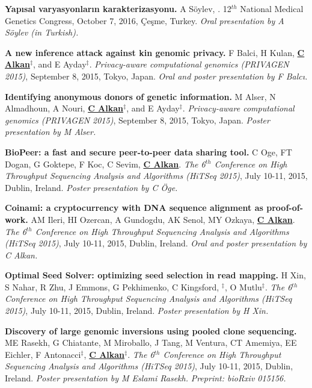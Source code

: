 \vspace{-.2cm}
       {\bf Yapısal varyasyonların karakterizasyonu.} A Söylev, \calkan{}. 12$^{th}$ National Medical Genetics Congress, October 7, 2016, Çeşme, Turkey.
       {\it Oral presentation by A Söylev (in Turkish).}
       
\vspace{-.2cm}
{\bf  A new inference attack against kin genomic privacy.}
F Balci, H Kulan, {\bf {\underline{C Alkan}}}$^\ddag$, and E Ayday$^\ddag$. 
{\em Privacy-aware computational genomics (PRIVAGEN 2015)}, 
 September 8, 2015, Tokyo, Japan. {\it Oral and poster presentation by F Balcı.}

 \vspace{-.2cm}
{\bf Identifying anonymous donors of genetic information.}
M Alser, N Almadhoun, A Nouri, {\bf {\underline{C Alkan}}}$^\ddag$, and E Ayday$^\ddag$. 
{\em Privacy-aware computational genomics (PRIVAGEN 2015)}, 
 September 8, 2015, Tokyo, Japan. {\it Poster presentation by M Alser.}


\vspace{-.2cm}
 {\bf BioPeer: a fast and secure peer-to-peer data sharing tool.}
  C Oge, FT Dogan, G Goktepe, F Koc, C Sevim, {\bf {\underline{C Alkan}}}.
{\em The 6$^{th}$ Conference on High Throughput Sequencing Analysis and Algorithms (HiTSeq 2015)}, 
July 10-11, 2015, Dublin, Ireland. {\it Poster presentation by C Öge.}

\vspace{-.2cm}
 {\bf Coinami: a cryptocurrency with DNA sequence alignment as proof-of-work.}
  AM Ileri, HI Ozercan, A Gundogdu, AK Senol, MY Ozkaya, {\bf {\underline{C Alkan}}}.
{\em The 6$^{th}$ Conference on High Throughput Sequencing Analysis and Algorithms (HiTSeq 2015)}, 
July 10-11, 2015, Dublin, Ireland. {\it Oral and poster presentation by C Alkan.}



\vspace{-.2cm}        
       {\bf Optimal Seed Solver: optimizing seed selection in read mapping.}
       H Xin, S Nahar, R Zhu, J Emmons, G Pekhimenko, C Kingsford, \calkan{}$^\ddag$, O Mutlu$^\ddag$.
{\em The 6$^{th}$ Conference on High Throughput Sequencing Analysis and Algorithms (HiTSeq 2015)}, 
July 10-11, 2015, Dublin, Ireland. {\it Poster presentation by H Xin.}



\vspace{-.2cm}
{\bf Discovery of large genomic inversions using pooled clone sequencing.}
ME Rasekh, G Chiatante, M Miroballo, J Tang, M Ventura, CT Amemiya, EE Eichler, F Antonacci$^\ddag$, {\bf {\underline{C Alkan}}}$^\ddag$.
{\em The 6$^{th}$ Conference on High Throughput Sequencing Analysis and Algorithms (HiTSeq 2015)}, 
July 10-11, 2015, Dublin, Ireland. {\it Poster presentation by M Eslami Rasekh.} \textit{Preprint: bioRxiv 015156.}

